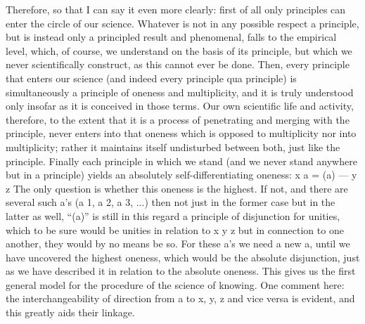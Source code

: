 Therefore, so that I can say it even more clearly:
first of all only principles can enter the circle of our science.
Whatever is not in any possible respect a principle,
but is instead only a principled result and phenomenal,
falls to the empirical level,
which, of course, we understand
on the basis of its principle,
but which we never scientifically construct,
as this cannot ever be done.
Then, every principle that enters our science
(and indeed every principle qua principle) is
simultaneously a principle of oneness and multiplicity,
and it is truly understood only insofar
as it is conceived in those terms.
Our own scientific life and activity,
therefore, to the extent that it is a process of
penetrating and merging with the principle,
never enters into that oneness
which is opposed to multiplicity
nor into multiplicity;
rather it maintains itself undisturbed between both,
just like the principle.
Finally each principle in which we stand
(and we never stand anywhere but in a principle)
yields an absolutely self-differentiating oneness:
x {a = (a) — y} z
The only question is whether this oneness is the highest.
If not, and there are several such a’s
(a 1, a 2, a 3, ...)
then not just in the former case
but in the latter as well,
“(a)” is still in this regard
a principle of disjunction for unities,
which to be sure would be unities in relation to
x y z
but in connection to one another,
they would by no means be so.
For these a’s we need a new a,
until we have uncovered the highest oneness,
which would be the absolute disjunction,
just as we have described it in relation
to the absolute oneness.
This gives us the first general model
for the procedure of the science of knowing.
One comment here: the interchangeability of
direction from a to x, y, z
and vice versa is evident,
and this greatly aids their linkage.


